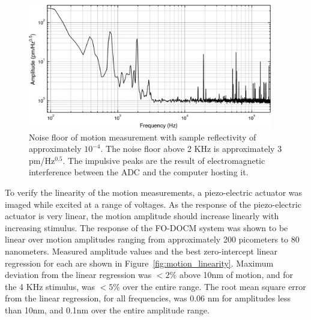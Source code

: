 
\begin{figure}[h!]
\centering
\includegraphics[width=0.95\textwidth]{Images/Results/noise_floor_2_big.png}
\caption[Noise floor of motion measurement with sample reflectivity of approximately $10^{-4}$.]{Noise floor of motion measurement with sample reflectivity of approximately $10^{-4}$. The noise floor above 2 KHz is approximately 3 pm/Hz$^{0.5}$. The impulsive peaks are the result of electromagnetic interference between the ADC and the computer hosting it. \label{fig:noise_floor2}}
\end{figure}

To verify the linearity of the motion measurements, a piezo-electric actuator was imaged while excited at a range of voltages. As the response of the piezo-electric actuator is very linear, the motion amplitude should increase linearly with increasing stimulus. \cite{klaassen} The response of the FO-DOCM system was shown to be linear over motion amplitudes ranging from approximately 200 picometers to 80 nanometers. Measured amplitude values and the best zero-intercept linear regression for each are shown in Figure~\ref{fig:motion_linearity}. Maximum deviation from the linear regression was $<2\%$ above 10nm of motion, and for the 4 KHz stimulus, was $<5\%$ over the entire range. The root mean square error from the linear regression, for all frequencies, was 0.06 nm for amplitudes less than 10nm, and 0.1nm over the entire amplitude range.

